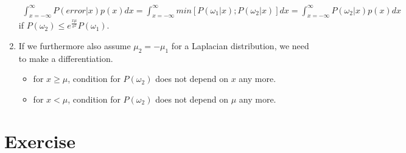 \documentclass[a4paper]{article}
\begin{document}
\begin{enumerate}[label={(\alph*)}]
			\begin{align*}
				\int_{x=-\infty}^\infty P(error|x)p(x)dx=\int_{x=-\infty}^\infty min[P(\omega_1|x); P(\omega_2|x)]dx=\int_{x=-\infty}^\infty P(\omega_2|x)p(x)dx
			\end{align*}
			if $P(\omega_2) \leq e^{\frac{x\mu}{\sigma^2}}P(\omega_1)$.
			\item If we furthermore also assume $\mu_2 = -\mu_1$ for a Laplacian distribution, we need to make a differentiation.
			\begin{itemize}
				\item for $x\geq \mu$, condition for $P(\omega_2)$ does not depend on $x$ any more.
				\item for $x < \mu$, condition for $P(\omega_2)$ does not depend on $\mu$ any more.
			\end{itemize}
		\end{enumerate}
	\section{Exercise}
\end{document}
